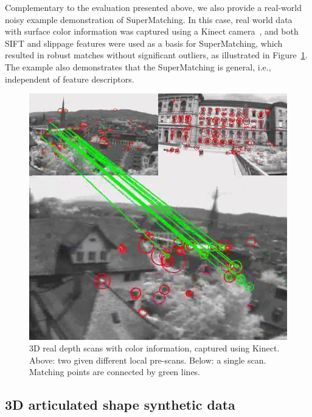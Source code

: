 Complementary to the evaluation presented above,
we also provide a real-world noisy example demonstration of SuperMatching. 
In this case, real world data with surface color information was captured using a Kinect camera~\cite{Kinect12}, 
and both SIFT and slippage features were used as a basis for SuperMatching,
which resulted in robust matches without significant outliers, as illustrated in Figure~\ref{fig:3DReal}.
The example also demonstrates that the SuperMatching is general, i.e., independent of feature descriptors.

\begin{figure}[h]
\centering
  \includegraphics[width=0.9\linewidth]{figures/3DReal.jpg}
  \caption{3D real depth scans with color information, captured using Kinect.
  Above: two given different local pre-scans.  Below: a single scan.
  Matching points are connected by green lines.}
\label{fig:3DReal}
\end{figure}

\subsection{3D articulated shape synthetic data}
\label{subsec:3darticulated}

